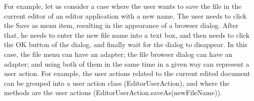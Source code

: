 For example, let us consider a case where the user wants to save the file in the current editor of an editor application with a new name. The user needs to click the Save as menu item, resulting in the appearance of a browser dialog. After that, he needs to enter the new file name into a text box, and then needs to click the OK button of the dialog, and finally wait for the dialog to disappear. In this case, the file menu can have an adapter; the file browser dialog can have an adapter; and using both of them in the same time in a given way can represent a user action. For example, the user actions related to the current edited document can be grouped into a user action class (EditorUserAction), and where the methods are the user actions (EditorUserAction.saveAs(newFileName)).















